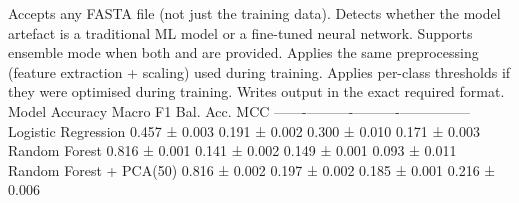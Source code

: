 {}\markdownRendererOlBeginTight
{}Accepts any FASTA file (not just the training data).\markdownRendererOlItemEnd 
{}Detects whether the model artefact is a traditional ML model or a fine-tuned neural network.\markdownRendererOlItemEnd 
{}Supports ensemble mode when both  and  are provided.\markdownRendererOlItemEnd 
{}Applies the same preprocessing (feature extraction + scaling) used during training.\markdownRendererOlItemEnd 
{}Applies per-class thresholds if they were optimised during training.\markdownRendererOlItemEnd 
{}Writes output in the exact required format.\markdownRendererOlItemEnd 
\markdownRendererOlEndTight \markdownRendererInterblockSeparator
{}\markdownRendererSectionBegin
{}\markdownRendererInterblockSeparator
{}\markdownRendererInterblockSeparator
{}\markdownRendererThematicBreak{}\markdownRendererInterblockSeparator
{}
\markdownRendererSectionEnd 
\markdownRendererSectionEnd \markdownRendererSectionBegin
{}\markdownRendererInterblockSeparator
{}\markdownRendererSectionBegin
{}\markdownRendererInterblockSeparator
{}\markdownRendererPipe{} Model \markdownRendererPipe{} Accuracy \markdownRendererPipe{} Macro F1 \markdownRendererPipe{} Bal. Acc. \markdownRendererPipe{} MCC \markdownRendererPipe{}\markdownRendererSoftLineBreak
{}\markdownRendererPipe{}-------\markdownRendererPipe{}----------\markdownRendererPipe{}----------\markdownRendererPipe{}-----------\markdownRendererPipe{}-----\markdownRendererPipe{}\markdownRendererSoftLineBreak
{}\markdownRendererPipe{} Logistic Regression \markdownRendererPipe{} 0.457 ± 0.003 \markdownRendererPipe{} 0.191 ± 0.002 \markdownRendererPipe{} 0.300 ± 0.010 \markdownRendererPipe{} 0.171 ± 0.003 \markdownRendererPipe{}\markdownRendererSoftLineBreak
{}\markdownRendererPipe{} Random Forest \markdownRendererPipe{} 0.816 ± 0.001 \markdownRendererPipe{} 0.141 ± 0.002 \markdownRendererPipe{} 0.149 ± 0.001 \markdownRendererPipe{} 0.093 ± 0.011 \markdownRendererPipe{}\markdownRendererSoftLineBreak
{}\markdownRendererPipe{} Random Forest + PCA(50) \markdownRendererPipe{} 0.816 ± 0.002 \markdownRendererPipe{} 0.197 ± 0.002 \markdownRendererPipe{} 0.185 ± 0.001 \markdownRendererPipe{} 0.216 ± 0.006 \markdownRendererPipe{}\markdownRendererSoftLineBreak
